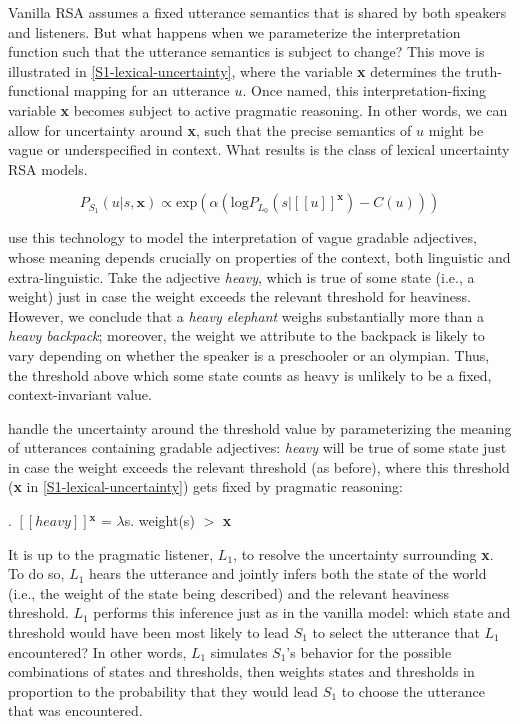 \documentclass{sp}
\newcommand{\lam}{\ensuremath{\lambda}}
\newcommand{\sem}[1]{\ensuremath{[\![#1]\!]}}
\begin{document}
Vanilla RSA assumes a fixed utterance semantics that is shared by both speakers and listeners. But what happens when we parameterize the interpretation function such that the utterance semantics is subject to change? This move is illustrated in \eqref{S1-lexical-uncertainty}, where the variable \textbf{x} determines the truth-functional mapping for an utterance $u$. Once named, this interpretation-fixing variable \textbf{x} becomes subject to active pragmatic reasoning. In other words, we can allow for uncertainty around \textbf{x}, such that the precise semantics of $u$ might be vague or underspecified in context. What results is the class of lexical uncertainty RSA models.

\begin{equation} \label{S1-lexical-uncertainty}
P_{S_1}(u|s, \textbf{x}) \propto \textrm{exp}(\alpha (\textrm{log}P_{L_0}(s|\sem{u}^{\textbf{x}}) - C(u)))
\end{equation}

\cite{lassitergoodman2013} use this technology to model the interpretation of vague gradable adjectives, whose meaning depends crucially on properties of the context, both linguistic and extra-linguistic. Take the adjective \emph{heavy}, which is true of some state (i.e., a weight) just in case the weight exceeds the relevant threshold for heaviness. However, we conclude that a \emph{heavy elephant} weighs substantially more than a \emph{heavy backpack}; moreover, the weight we attribute to the backpack is likely to vary depending on whether the speaker is a preschooler or an olympian. Thus, the threshold above which some state counts as heavy is unlikely to be a fixed, context-invariant value. 

\citeauthor{lassitergoodman2013} handle the uncertainty around the threshold value by parameterizing the meaning of utterances containing gradable adjectives: \emph{heavy} will be true of some state just in case the weight exceeds the relevant threshold (as before), where this threshold (\textbf{x} in \eqref{S1-lexical-uncertainty}) gets fixed by pragmatic reasoning:

\ex. \label{heavy-sem}
\sem{heavy}$^{\textbf{x}}$ = \lam s. weight(s) $>$ \textbf{x}

It is up to the pragmatic listener, $L_1$, to resolve the uncertainty surrounding \textbf{x}. To do so, $L_1$ hears the utterance and jointly infers both the state of the world (i.e., the weight of the state being described) and the relevant heaviness threshold. $L_1$ performs this inference just as in the vanilla model: which state and threshold would have been most likely to lead $S_1$ to select the utterance that $L_1$ encountered? In other words, $L_1$ simulates $S_1$'s behavior for the possible combinations of states and thresholds, then weights states and thresholds in proportion to the probability that they would lead $S_1$ to choose the utterance that was encountered.
\end{document}
